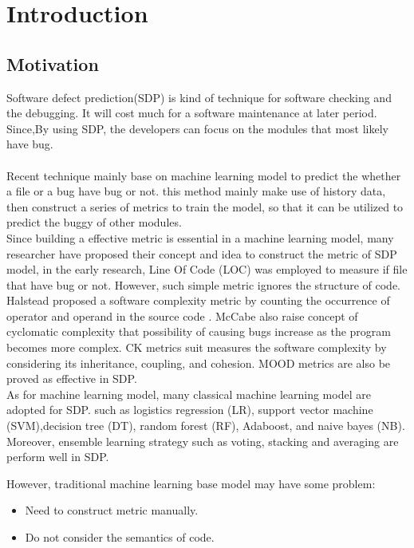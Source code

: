 \chapter{Introduction}
\section{Motivation}
Software defect prediction(SDP) is kind of technique for software checking and the debugging. It will cost much for a software maintenance at later period. Since,By using SDP, the developers can focus on the modules that most likely have bug.\\
\\
Recent technique mainly base on machine learning model to predict the whether a file or a bug have bug or not. this method mainly make use of history data, then construct a series of metrics to train the model, so that it can be utilized to predict the buggy of other modules.\\

Since building a effective metric is essential in a machine learning model, many researcher have proposed their concept and idea to construct the metric of SDP model, in the early research, Line Of Code (LOC)\cite{} was employed to measure if file that have bug or not. However, such simple metric ignores the structure of code. Halstead proposed a software complexity metric by counting the occurrence of operator and operand in the source code \cite{}. McCabe also raise concept of cyclomatic complexity that possibility of causing bugs increase as the program becomes more complex\cite{}. CK metrics suit measures the software complexity by considering its inheritance, coupling, and cohesion. MOOD \cite{} metrics are also be proved as effective in SDP. \\

As for machine learning model, many classical machine learning model are adopted for SDP. such as logistics regression (LR), support vector machine (SVM),decision tree (DT), random forest (RF), Adaboost, and naive bayes (NB). Moreover, ensemble learning strategy such as voting, stacking and averaging are perform well in SDP. 

However, traditional machine learning base model may have some problem:
\begin{itemize}
    \item Need to construct metric manually.
    \item Do not consider the semantics of code.
\end{itemize}

